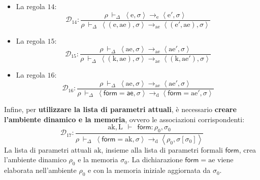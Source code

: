 \documentclass[a4paper]{article}
\begin{document}
	\begin{itemize}
		\item La regola $14$:
		\begin{equation*}
			\mathcal{D}_{14}: \dfrac{
				\rho \: \vdash_{\Delta} \: \left\langle \mathrm{e}, \sigma \right\rangle \longrightarrow_{\mathrm{e}} \left\langle \mathrm{e}', \sigma \right\rangle
			}{
				\rho \: \vdash_{\Delta} \: \left\langle \left(\mathrm{e}, \mathrm{ae}\right), \sigma \right\rangle \longrightarrow_{\mathrm{ae}} \left\langle \left(\mathrm{e}', \mathrm{ae}\right), \sigma \right\rangle
			}
		\end{equation*}
		
		\item La regola $15$:
		\begin{equation*}
			\mathcal{D}_{15}: \dfrac{
				\rho \: \vdash_{\Delta} \: \left\langle \mathrm{ae}, \sigma \right\rangle \longrightarrow_{\mathrm{ae}} \left\langle \mathrm{ae}', \sigma \right\rangle
			}{
				\rho \: \vdash_{\Delta} \: \left\langle \left(\mathrm{k}, \mathrm{ae}\right), \sigma \right\rangle \longrightarrow_{\mathrm{ae}} \left\langle \left(\mathrm{k}, \mathrm{ae}'\right), \sigma \right\rangle
			}
		\end{equation*}
		
		\item La regola $16$:
		\begin{equation*}
			\mathcal{D}_{16}: \dfrac{
				\rho \: \vdash_{\Delta} \: \left\langle \mathrm{ae}, \sigma \right\rangle \longrightarrow_{\mathrm{ae}} \left\langle \mathrm{ae}', \sigma \right\rangle
			}{
				\rho \: \vdash_{\Delta} \: \left\langle \textsf{form} = \textsf{ae}, \sigma \right\rangle \longrightarrow_{\mathrm{d}} \left\langle \textsf{form} = \mathrm{ae}', \sigma \right\rangle
			}
		\end{equation*}
	\end{itemize}
	Infine, per \textbf{utilizzare la lista di parametri attuali}, è necessario \textbf{creare l'ambiente dinamico e la memoria}, ovvero le associazioni corrispondenti:
	\begin{equation*}
		\mathcal{D}_{17} : \dfrac{
			\mathrm{ak}, \mathrm{L} \:\: \vdash \:\: \textsf{form}: \rho_{0}, \sigma_{0}
		}{
			\rho \: \vdash_{\Delta} \: \left\langle \textsf{form} = \mathrm{ak}, \sigma \right\rangle \longrightarrow_{\mathrm{d}} \left\langle \rho_{0}, \sigma\left[\sigma_{0}\right] \right\rangle
		}
	\end{equation*}
	La lista di parametri attuali $\mathrm{ak}$, insieme alla lista di parametri formali $\textsf{form}$, crea l'ambiente dinamico $\rho_{0}$ e la memoria $\sigma_{0}$. La dichiarazione $\textsf{form} = \mathrm{ae}$ viene elaborata nell'ambiente $\rho_{0}$ e con la memoria iniziale aggiornata da $\sigma_{0}$.\newline
	
\end{document}
